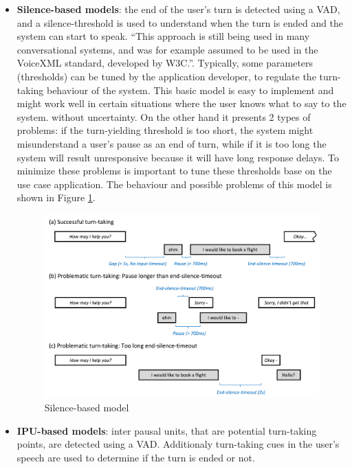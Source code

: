 \documentclass[../main.tex]{subfiles}
\begin{document}
\begin{itemize}
\item \textbf{Silence-based models}: the end of the user’s turn is detected using a VAD, and a silence-threshold is used to understand when the turn is ended and the system can start to speak. “This approach is still being used in many conversational systems, and was for example assumed to be used in the VoiceXML standard, developed by W3C.”. Typically, some parameters (thresholds) can be tuned by the application developer, to regulate the turn-taking behaviour of the system.
This basic model is easy to implement and might work well in certain situations where the user knows what to say to the system. without uncertainty. On the other hand it presents 2 types of problems: if the turn-yielding threshold is too short, the system might misunderstand a user’s pause as an end of turn, while if it is too long the system will result unresponsive because it will have long response delays. To minimize these problems is important to tune these thresholds base on the use case application. The behaviour and possible problems of this model is shown in Figure \ref{fig:silence-based}.

\begin{figure}[ht]
    \centering
    \includegraphics[width=\textwidth]{images/Silence-based model.png}
    \caption{Silence-based model \cite{skantze2021turn}}
    \label{fig:silence-based}
\end{figure}

\item \textbf{IPU-based models}: inter pausal units, that are potential turn-taking points, are detected using a VAD. Additionaly turn-taking cues in the user's speech are used to determine if the turn is ended or not. 


\end{itemize}
\end{document}
